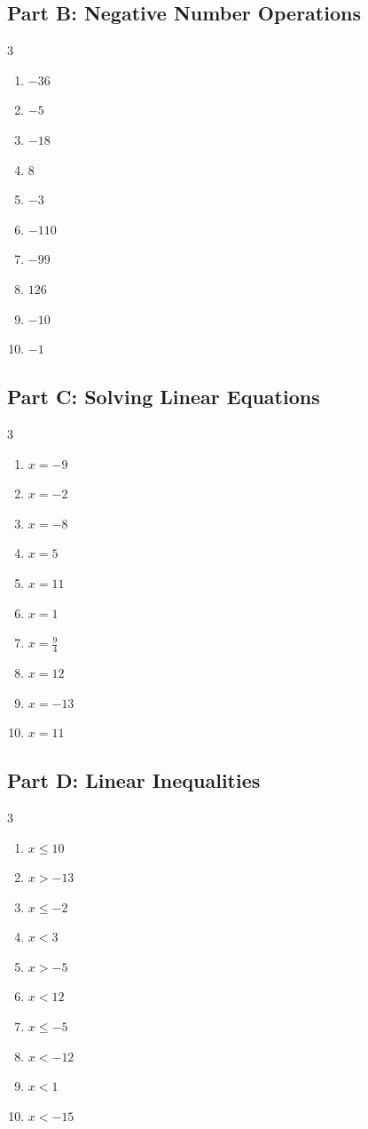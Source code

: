\documentclass[11pt]{article}
\begin{document}
\subsection*{Part B: Negative Number Operations}
\begin{multicols}{3}
\begin{enumerate}
  \item $-36$
  \item $-5$
  \item $-18$
  \item $8$
  \item $-3$
  \item $-110$
  \item $-99$
  \item $126$
  \item $-10$
  \item $-1$
\end{enumerate}
\end{multicols}
\subsection*{Part C: Solving Linear Equations}
\begin{multicols}{3}
\begin{enumerate}
  \item $x = -9$
  \item $x = -2$
  \item $x = -8$
  \item $x = 5$
  \item $x = 11$
  \item $x = 1$
  \item $x = \frac{9}{4}$
  \item $x = 12$
  \item $x = -13$
  \item $x = 11$
\end{enumerate}
\end{multicols}
\subsection*{Part D: Linear Inequalities}
\begin{multicols}{3}
\begin{enumerate}
  \item $x \le 10$
  \item $x > -13$
  \item $x \le -2$
  \item $x < 3$
  \item $x > -5$
  \item $x < 12$
  \item $x \le -5$
  \item $x < -12$
  \item $x < 1$
  \item $x < -15$
\end{enumerate}
\end{multicols}
\end{document}
